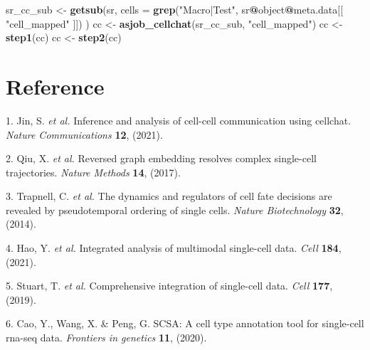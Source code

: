 \documentclass[
]{article}
\newenvironment{Shaded}{\begin{snugshade}}{\end{snugshade}}
\newcommand{\DataTypeTok}[1]{\textcolor[rgb]{0.13,0.29,0.53}{#1}}
\newcommand{\KeywordTok}[1]{\textcolor[rgb]{0.13,0.29,0.53}{\textbf{#1}}}
\newcommand{\NormalTok}[1]{#1}
\newcommand{\OperatorTok}[1]{\textcolor[rgb]{0.81,0.36,0.00}{\textbf{#1}}}
\newcommand{\StringTok}[1]{\textcolor[rgb]{0.31,0.60,0.02}{#1}}
\newenvironment{cslreferences}%
  {}%
  {\par}
\begin{document}
\begin{Shaded}
\begin{Highlighting}[]
\NormalTok{sr\_cc\_sub \textless{}{-}}\StringTok{ }\KeywordTok{getsub}\NormalTok{(sr,}
  \DataTypeTok{cells =} \KeywordTok{grep}\NormalTok{(}\StringTok{"Macro|Test"}\NormalTok{, sr}\OperatorTok{@}\NormalTok{object}\OperatorTok{@}\NormalTok{meta.data[[ }\StringTok{"cell\_mapped"}\NormalTok{ ]])}
\NormalTok{)}
\NormalTok{cc \textless{}{-}}\StringTok{ }\KeywordTok{asjob\_cellchat}\NormalTok{(sr\_cc\_sub, }\StringTok{"cell\_mapped"}\NormalTok{)}
\NormalTok{cc \textless{}{-}}\StringTok{ }\KeywordTok{step1}\NormalTok{(cc)}
\NormalTok{cc \textless{}{-}}\StringTok{ }\KeywordTok{step2}\NormalTok{(cc)}
\end{Highlighting}
\end{Shaded}

\hypertarget{bibliography}{%
\section*{Reference}\label{bibliography}}

\hypertarget{refs}{}
\begin{cslreferences}
\leavevmode\hypertarget{ref-InferenceAndAJinS2021}{}%
1. Jin, S. \emph{et al.} Inference and analysis of cell-cell communication using cellchat. \emph{Nature Communications} \textbf{12}, (2021).

\leavevmode\hypertarget{ref-ReversedGraphQiuX2017}{}%
2. Qiu, X. \emph{et al.} Reversed graph embedding resolves complex single-cell trajectories. \emph{Nature Methods} \textbf{14}, (2017).

\leavevmode\hypertarget{ref-TheDynamicsAnTrapne2014}{}%
3. Trapnell, C. \emph{et al.} The dynamics and regulators of cell fate decisions are revealed by pseudotemporal ordering of single cells. \emph{Nature Biotechnology} \textbf{32}, (2014).

\leavevmode\hypertarget{ref-IntegratedAnalHaoY2021}{}%
4. Hao, Y. \emph{et al.} Integrated analysis of multimodal single-cell data. \emph{Cell} \textbf{184}, (2021).

\leavevmode\hypertarget{ref-ComprehensiveIStuart2019}{}%
5. Stuart, T. \emph{et al.} Comprehensive integration of single-cell data. \emph{Cell} \textbf{177}, (2019).

\leavevmode\hypertarget{ref-ScsaACellTyCaoY2020}{}%
6. Cao, Y., Wang, X. \& Peng, G. SCSA: A cell type annotation tool for single-cell rna-seq data. \emph{Frontiers in genetics} \textbf{11}, (2020).
\end{cslreferences}
\end{document}
